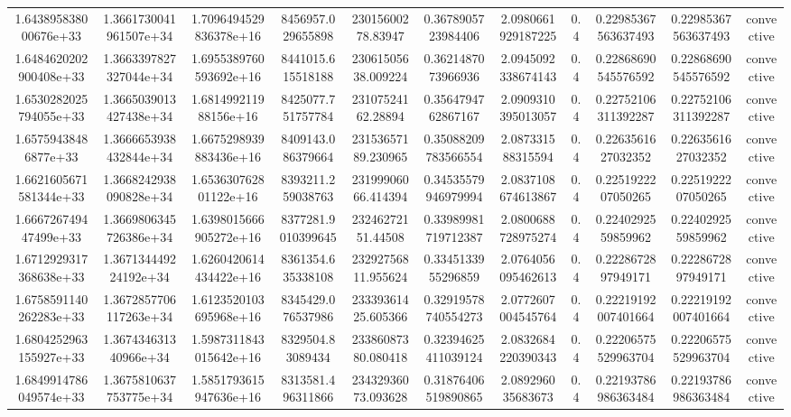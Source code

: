 \begin{table}
\begin{tabular}{ccccccccccc}
1.643895838000676e+33 & 1.3661730041961507e+34 & 1.7096494529836378e+16 & 8456957.029655898 & 23015600278.83947 & 0.3678905723984406 & 2.0980661929187225 & 0.4 & 0.22985367563637493 & 0.22985367563637493 & convective \\
1.6484620202900408e+33 & 1.3663397827327044e+34 & 1.6955389760593692e+16 & 8441015.615518188 & 23061505638.009224 & 0.3621487073966936 & 2.0945092338674143 & 0.4 & 0.22868690545576592 & 0.22868690545576592 & convective \\
1.6530282025794055e+33 & 1.3665039013427438e+34 & 1.681499211988156e+16 & 8425077.751757784 & 23107524162.28894 & 0.3564794762867167 & 2.0909310395013057 & 0.4 & 0.22752106311392287 & 0.22752106311392287 & convective \\
1.65759438486877e+33 & 1.3666653938432844e+34 & 1.6675298939883436e+16 & 8409143.086379664 & 23153657189.230965 & 0.35088209783566554 & 2.087331588315594 & 0.4 & 0.2263561627032352 & 0.2263561627032352 & convective \\
1.6621605671581344e+33 & 1.3668242938090828e+34 & 1.653630762801122e+16 & 8393211.259038763 & 23199906066.414394 & 0.34535579946979994 & 2.0837108674613867 & 0.4 & 0.2251922207050265 & 0.2251922207050265 & convective \\
1.666726749447499e+33 & 1.3669806345726386e+34 & 1.6398015666905272e+16 & 8377281.9010399645 & 23246272151.44508 & 0.33989981719712387 & 2.0800688728975274 & 0.4 & 0.2240292559859962 & 0.2240292559859962 & convective \\
1.6712929317368638e+33 & 1.367134449224192e+34 & 1.6260420614434422e+16 & 8361354.635338108 & 23292756811.955624 & 0.3345133955296859 & 2.0764056095462613 & 0.4 & 0.2228672897949171 & 0.2228672897949171 & convective \\
1.6758591140262283e+33 & 1.3672857706117263e+34 & 1.6123520103695968e+16 & 8345429.076537986 & 23339361425.605366 & 0.32919578740554273 & 2.0772607004545764 & 0.4 & 0.22219192007401664 & 0.22219192007401664 & convective \\
1.6804252963155927e+33 & 1.367434631340966e+34 & 1.5987311843015642e+16 & 8329504.83089434 & 23386087380.080418 & 0.32394625411039124 & 2.0832684220390343 & 0.4 & 0.22206575529963704 & 0.22206575529963704 & convective \\
1.6849914786049574e+33 & 1.3675810637753775e+34 & 1.5851793615947636e+16 & 8313581.496311866 & 23432936073.093628 & 0.31876406519890865 & 2.089296035683673 & 0.4 & 0.22193786986363484 & 0.22193786986363484 & convective \\

\end{tabular}
\end{table}
